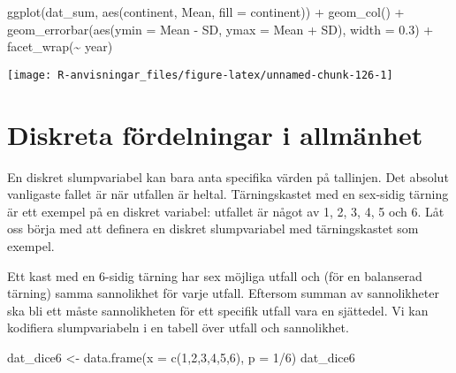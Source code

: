 \documentclass[
]{book}
\newenvironment{Shaded}{\begin{snugshade}}{\end{snugshade}}
\newcommand{\AttributeTok}[1]{\textcolor[rgb]{0.77,0.63,0.00}{#1}}
\newcommand{\DecValTok}[1]{\textcolor[rgb]{0.00,0.00,0.81}{#1}}
\newcommand{\FloatTok}[1]{\textcolor[rgb]{0.00,0.00,0.81}{#1}}
\newcommand{\FunctionTok}[1]{\textcolor[rgb]{0.00,0.00,0.00}{#1}}
\newcommand{\NormalTok}[1]{#1}
\newcommand{\OtherTok}[1]{\textcolor[rgb]{0.56,0.35,0.01}{#1}}
\newcommand{\SpecialCharTok}[1]{\textcolor[rgb]{0.00,0.00,0.00}{#1}}
\theoremstyle{definition}
\theoremstyle{definition}
\theoremstyle{definition}
\theoremstyle{definition}
\theoremstyle{remark}
\begin{document}
\begin{Shaded}
\begin{Highlighting}[]
\FunctionTok{ggplot}\NormalTok{(dat\_sum, }\FunctionTok{aes}\NormalTok{(continent, Mean, }\AttributeTok{fill =}\NormalTok{ continent)) }\SpecialCharTok{+}
  \FunctionTok{geom\_col}\NormalTok{() }\SpecialCharTok{+}
  \FunctionTok{geom\_errorbar}\NormalTok{(}\FunctionTok{aes}\NormalTok{(}\AttributeTok{ymin =}\NormalTok{ Mean }\SpecialCharTok{{-}}\NormalTok{ SD, }\AttributeTok{ymax =}\NormalTok{ Mean }\SpecialCharTok{+}\NormalTok{ SD), }\AttributeTok{width =} \FloatTok{0.3}\NormalTok{) }\SpecialCharTok{+}
  \FunctionTok{facet\_wrap}\NormalTok{(}\SpecialCharTok{\textasciitilde{}}\NormalTok{ year)}
\end{Highlighting}
\end{Shaded}

\begin{center}\texttt{[image: R-anvisningar\_files/figure-latex/unnamed-chunk-126-1]} \end{center}

\hypertarget{diskreta-fuxf6rdelningar-i-allmuxe4nhet}{%
\section{Diskreta fördelningar i allmänhet}\label{diskreta-fuxf6rdelningar-i-allmuxe4nhet}}

En diskret slumpvariabel kan bara anta specifika värden på tallinjen. Det absolut vanligaste fallet är när utfallen är heltal. Tärningskastet med en sex-sidig tärning är ett exempel på en diskret variabel: utfallet är något av 1, 2, 3, 4, 5 och 6. Låt oss börja med att definera en diskret slumpvariabel med tärningskastet som exempel.

Ett kast med en 6-sidig tärning har sex möjliga utfall och (för en balanserad tärning) samma sannolikhet för varje utfall. Eftersom summan av sannolikheter ska bli ett måste sannolikheten för ett specifik utfall vara en sjättedel. Vi kan kodifiera slumpvariabeln i en tabell över utfall och sannolikhet.

\begin{Shaded}
\begin{Highlighting}[]
\NormalTok{dat\_dice6 }\OtherTok{\textless{}{-}} \FunctionTok{data.frame}\NormalTok{(}\AttributeTok{x =} \FunctionTok{c}\NormalTok{(}\DecValTok{1}\NormalTok{,}\DecValTok{2}\NormalTok{,}\DecValTok{3}\NormalTok{,}\DecValTok{4}\NormalTok{,}\DecValTok{5}\NormalTok{,}\DecValTok{6}\NormalTok{),}
                        \AttributeTok{p =} \DecValTok{1}\SpecialCharTok{/}\DecValTok{6}\NormalTok{)}
\NormalTok{dat\_dice6}
\end{Highlighting}
\end{Shaded}
\end{document}
